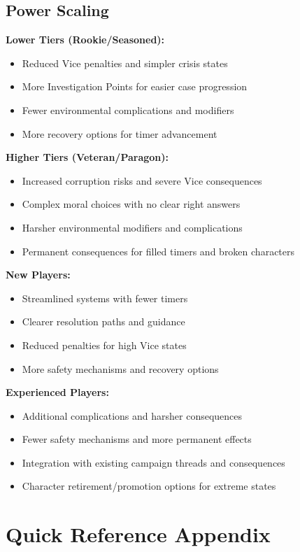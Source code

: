 \documentclass[11pt]{article}
\begin{document}
\subsection{Power Scaling}

\textbf{Lower Tiers (Rookie/Seasoned):}
\begin{itemize}
\item Reduced Vice penalties and simpler crisis states
\item More Investigation Points for easier case progression
\item Fewer environmental complications and modifiers
\item More recovery options for timer advancement
\end{itemize}

\textbf{Higher Tiers (Veteran/Paragon):}
\begin{itemize}
\item Increased corruption risks and severe Vice consequences
\item Complex moral choices with no clear right answers
\item Harsher environmental modifiers and complications
\item Permanent consequences for filled timers and broken characters
\end{itemize}

\textbf{New Players:}
\begin{itemize}
\item Streamlined systems with fewer timers
\item Clearer resolution paths and guidance
\item Reduced penalties for high Vice states
\item More safety mechanisms and recovery options
\end{itemize}

\textbf{Experienced Players:}
\begin{itemize}
\item Additional complications and harsher consequences
\item Fewer safety mechanisms and more permanent effects
\item Integration with existing campaign threads and consequences
\item Character retirement/promotion options for extreme states
\end{itemize}

\section{Quick Reference Appendix}
\end{document}
